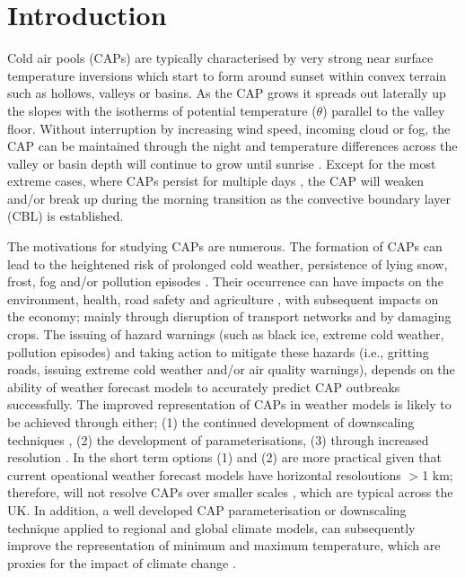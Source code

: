 \documentclass[times]{qjrms4}
\begin{document}

\maketitle

\section{Introduction}
Cold air pools (CAPs) are typically characterised by very strong near surface temperature inversions which start to form around sunset within convex terrain such as hollows, valleys or basins. As the CAP grows it spreads out laterally up the slopes with the isotherms of potential temperature ($\theta$) parallel to the valley floor. Without interruption by increasing wind speed, incoming cloud or fog, the CAP can be maintained through the night and temperature differences across the valley or basin depth will continue to grow until sunrise \citep{gustavssonetal1998}. Except for the most extreme cases, where CAPs persist for multiple days \citep{whiteman2001cold}, the CAP will weaken and/or break up during the morning transition as the convective boundary layer (CBL) is established.

The motivations for studying CAPs are numerous. The formation of CAPs can lead to the heightened risk of prolonged cold weather, persistence of lying snow, frost, fog and/or pollution episodes \citep{lareauetal2013persist}. Their occurrence can have impacts on the environment, health, road safety \citep{bogren2000local} and agriculture \citep{lindkvistetal2000,madelin2005spatial}, with subsequent impacts on the economy; mainly through disruption of transport networks and by damaging crops. The issuing of hazard warnings (such as black ice, extreme cold weather, pollution episodes) and taking action to mitigate these hazards (i.e., gritting roads, issuing extreme cold weather and/or air quality warnings), depends on the ability of weather forecast models to accurately predict CAP outbreaks successfully. The improved representation of CAPs in weather models is likely to be achieved through either; (1) the continued development of downscaling techniques \citep{pozdnoukhov2009data,sheridan2013characteristics}, (2) the development of parameterisations, (3) through increased resolution \citep{vosper2013high,hughes2015assessment}. In the short term options (1) and (2) are more practical given that current opeational weather forecast models have horizontal resoloutions $>$1 km; therefore, will not resolve CAPs over smaller scales \citep{vosper2013high}, which are typical across the UK. In addition, a well developed CAP parameterisation or downscaling technique applied to regional and global climate models, can subsequently improve the representation of minimum and maximum temperature, which are proxies for the impact of climate change \citep{daly2010local}.
	
\end{document}
